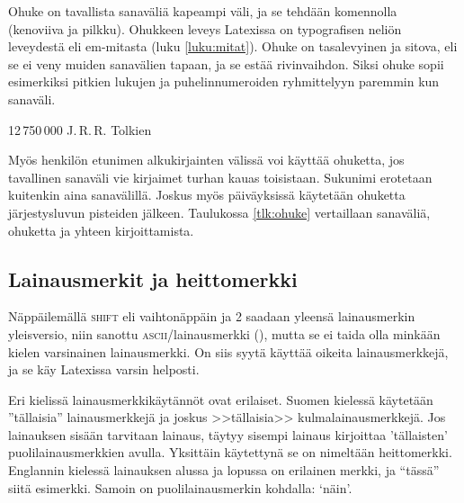 Ohuke on tavallista sanaväliä kapeampi väli, ja se tehdään
komennolla~\komentom{,} (kenoviiva ja pilkku). Ohukkeen leveys Latexissa
on  typografisen neliön leveydestä eli em-mitasta (luku
\ref{luku:mitat}). Ohuke on tasalevyinen ja sitova, eli se ei veny
muiden sanavälien tapaan, ja se estää rivinvaihdon. Siksi ohuke sopii
esimerkiksi pitkien lukujen ja puhelinnumeroiden ryhmittelyyn paremmin
kun sanaväli.

\komentoi{,}
\begin{koodilohkosis}
12\,750\,000
J.\,R.\,R. Tolkien
\end{koodilohkosis}

Myös henkilön etunimen alkukirjainten välissä voi käyttää ohuketta, jos
tavallinen sanaväli vie kirjaimet turhan kauas toisistaan. Sukunimi
erotetaan kuitenkin aina sanavälillä. Joskus myös päiväyksissä käytetään
ohuketta järjestysluvun pisteiden jälkeen. Taulukossa \ref{tlk:ohuke}
vertaillaan sanaväliä, ohuketta ja yhteen kirjoittamista.


\subsection{Lainausmerkit ja heittomerkki}
\label{luku:lainausmerkit}

Näppäilemällä \textsc{shift} eli vaihtonäppäin ja 2 saadaan yleensä
lainausmerkin yleisversio, niin sanottu \textsc{ascii}\-/lainausmerkki
(\textquotedbl), mutta se ei taida olla minkään kielen varsinainen
lainausmerkki. On siis syytä käyttää oikeita lainausmerkkejä, ja se käy
Latexissa varsin helposti.

Eri kielissä lainausmerkkikäytännöt ovat erilaiset. Suomen kielessä
käytetään ''tällaisia'' lainausmerkkejä ja joskus >>tällaisia>>
kulmalainausmerkkejä. Jos lainauksen sisään tarvitaan lainaus, täytyy
sisempi lainaus kirjoittaa 'tällaisten' puolilainausmerkkien avulla.
Yksittäin käytettynä se on nimeltään heittomerkki. Englannin kielessä
lainauksen alussa ja lopussa on erilainen merkki, ja ``tässä'' siitä
esimerkki. Samoin on puolilainausmerkin kohdalla: `näin'.


